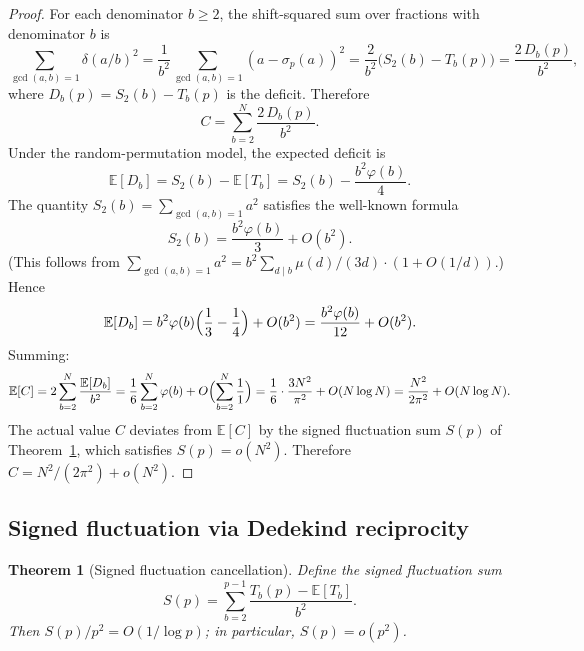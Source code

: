 \documentclass[11pt]{article}
\newtheorem{theorem}{Theorem}[section]
\theoremstyle{definition}
\begin{document}
\begin{proof}
For each denominator $b \ge 2$, the shift-squared sum over fractions
with denominator $b$ is
\[
  \sum_{\gcd(a,b)=1} \delta(a/b)^2
  = \frac{1}{b^2}\sum_{\gcd(a,b)=1} (a - \sigma_p(a))^2
  = \frac{2}{b^2}\bigl(S_2(b) - T_b(p)\bigr)
  = \frac{2\,D_b(p)}{b^2},
\]
where $D_b(p) = S_2(b) - T_b(p)$ is the deficit.  Therefore
\begin{equation}\label{eq:C-deficit}
  C = \sum_{b=2}^{N} \frac{2\,D_b(p)}{b^2}.
\end{equation}
Under the random-permutation model, the expected deficit is
\begin{equation}\label{eq:expected-deficit}
  \mathbb{E}[D_b] = S_2(b) - \mathbb{E}[T_b]
  = S_2(b) - \frac{b^2\varphi(b)}{4}.
\end{equation}
The quantity $S_2(b) = \sum_{\gcd(a,b)=1} a^2$ satisfies the
well-known formula
\[
  S_2(b) = \frac{b^2\varphi(b)}{3} + O(b^2).
\]
(This follows from $\sum_{\gcd(a,b)=1} a^2 = b^2 \sum_{d \mid b}
\mu(d)/(3d) \cdot (1 + O(1/d))$.)  Hence
\[
  \mathbb{E}[D_b] = b^2\varphi(b)\Bigl(\frac{1}{3} - \frac{1}{4}\Bigr)
    + O(b^2) = \frac{b^2\varphi(b)}{12} + O(b^2).
\]
Summing:
\[
  \mathbb{E}[C] = 2\sum_{b=2}^{N} \frac{\mathbb{E}[D_b]}{b^2}
  = \frac{1}{6}\sum_{b=2}^{N} \varphi(b) + O\Bigl(\sum_{b=2}^{N} \frac{1}{1}\Bigr)
  = \frac{1}{6} \cdot \frac{3N^2}{\pi^2} + O(N \log N)
  = \frac{N^2}{2\pi^2} + O(N \log N).
\]
The actual value $C$ deviates from $\mathbb{E}[C]$ by the signed
fluctuation sum $S(p)$ of Theorem~\ref{thm:signed-fluct}, which
satisfies $S(p) = o(N^2)$.  Therefore $C = N^2/(2\pi^2) + o(N^2)$.
\end{proof}

\subsection{Signed fluctuation via Dedekind reciprocity}\label{sec:signed-fluct}

\begin{theorem}[Signed fluctuation cancellation]\label{thm:signed-fluct}
Define the signed fluctuation sum
\[
  S(p) = \sum_{b=2}^{p-1}
    \frac{T_b(p) - \mathbb{E}[T_b]}{b^2}.
\]
Then $S(p)/p^2 = O(1/\log p)$; in particular, $S(p) = o(p^2)$.
\end{theorem}
\end{document}
